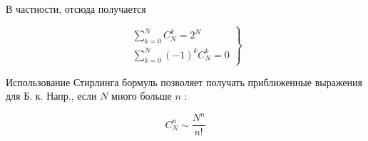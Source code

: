 \documentclass[10pt]{article}
\begin{document}
В частности, отсюда получается



\[

\left.\begin{array}{l}

\sum_{k=0}^{N} C_{N}^{k}=2^{N} \\

\sum_{k=0}^{N}(-1)^{k} C_{N}^{k}=0

\end{array}\right\}

\]



Использование Стирлинга бормуль позволяет получать приближенные выражения для Б. к. Напр., если $N$ много больше $n$ :



\[

C_{N}^{n} \sim \frac{N^{n}}{n !}

\]
\end{document}

